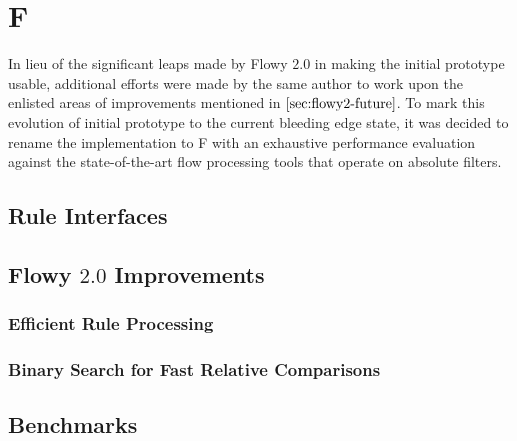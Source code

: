 \chapter{F}\label{ch:f}

In lieu of the significant leaps made by Flowy $2.0$ in making the initial prototype usable, additional efforts were made by the same author to work upon the enlisted areas of improvements mentioned in $\ref{sec:flowy2-future}$. To mark this evolution of initial prototype to the current bleeding edge state, it was decided to rename the implementation to F \cite{jschauer:2012} with an exhaustive performance evaluation against the state-of-the-art flow processing tools \cite{sromig:2000, phaag:2006} that operate on absolute filters.

\section{Rule Interfaces}\label{sec:rule-interfaces}

\section{Flowy $2.0$ Improvements}\label{sec:flowy-2-improvements}

\subsection{Efficient Rule Processing}\label{sec:rule-processing}
\subsection{Binary Search for
 						Fast Relative Comparisons}\label{sec:binary-search}

\section{Benchmarks}\label{sec:f-benchmarks}